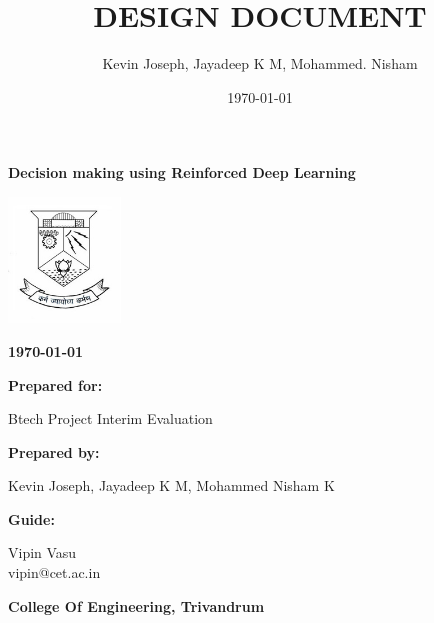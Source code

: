 \documentclass[twoside,letterpaper]{article}
\title{DESIGN DOCUMENT}
\author{Kevin Joseph, Jayadeep K M, Mohammed. Nisham}
\date{\today}
\begin{document}


\bigskip

{\centering{}\bfseries\color{black}
Decision making using Reinforced Deep Learning
\par}


\bigskip

\centering
\includegraphics[width=3cm]{images/logo.jpg}

\bigskip

{\centering{}\bfseries\color{black}
\today
\par}


\bigskip


\bigskip

{\centering{}\bfseries\color{black}
Prepared for:
\par}

{\centering{}\color{black}
Btech Project Interim Evaluation
\par}


\bigskip


\bigskip

{\centering{}\bfseries\color{black}
Prepared by:
\par}

{\centering{}\color{black}
Kevin Joseph, Jayadeep K M, Mohammed Nisham K
\par}
\bigskip
{\centering{}\bfseries\color{black}
Guide:
\par}

{\centering{}\color{black}
Vipin Vasu\\
vipin@cet.ac.in\\
\par}
\bigskip
{\bfseries\color{black}
College Of Engineering, Trivandrum
\par}

\end{document}
